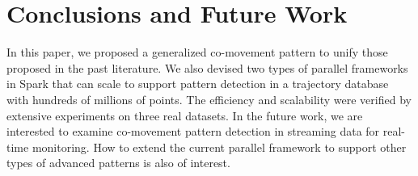 \section{Conclusions and Future Work}
\label{sec:concl}
In this paper, we proposed a generalized co-movement pattern to unify those proposed in the past literature. We also devised two types of parallel frameworks in Spark that can scale to support pattern detection in a trajectory database with hundreds of millions of points. The efficiency and scalability were verified by extensive experiments on three real datasets. In the future work, we are interested to examine co-movement pattern detection in streaming data for real-time monitoring. How to extend the current parallel framework to support other types of advanced patterns is also of interest.